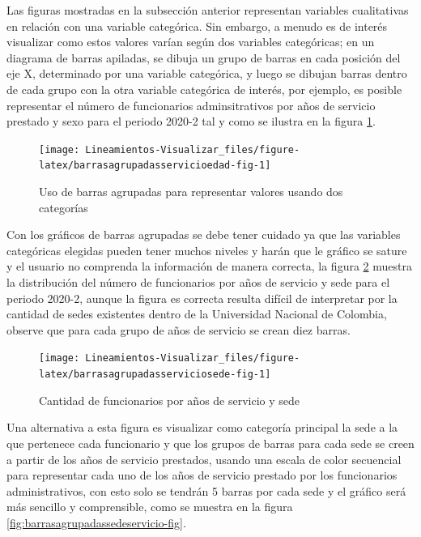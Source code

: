 \documentclass[
]{book}
\begin{document}
Las figuras mostradas en la subsección anterior representan variables cualitativas en relación con una variable categórica. Sin embargo, a menudo es de interés visualizar como estos valores varían según dos variables categóricas; en un diagrama de barras apiladas, se dibuja un grupo de barras en cada posición del eje X, determinado por una variable categórica, y luego se dibujan barras dentro de cada grupo con la otra variable categórica de interés, por ejemplo, es posible representar el número de funcionarios adminsitrativos por años de servicio prestado y sexo para el periodo 2020-2 tal y como se ilustra en la figura \ref{fig:barrasagrupadasservicioedad-fig}.

\begin{figure}

{\centering \texttt{[image: Lineamientos-Visualizar\_files/figure-latex/barrasagrupadasservicioedad-fig-1]} 

}

\caption{Uso de barras agrupadas para representar valores usando dos categorías}\label{fig:barrasagrupadasservicioedad-fig}
\end{figure}

Con los gráficos de barras agrupadas se debe tener cuidado ya que las variables categóricas elegidas pueden tener muchos niveles y harán que le gráfico se sature y el usuario no comprenda la información de manera correcta, la figura \ref{fig:barrasagrupadasserviciosede-fig} muestra la distribución del número de funcionarios por años de servicio y sede para el periodo 2020-2, aunque la figura es correcta resulta difícil de interpretar por la cantidad de sedes existentes dentro de la Universidad Nacional de Colombia, observe que para cada grupo de años de servicio se crean diez barras.

\begin{figure}

{\centering \texttt{[image: Lineamientos-Visualizar\_files/figure-latex/barrasagrupadasserviciosede-fig-1]} 

}

\caption{Cantidad de funcionarios por años de servicio y sede}\label{fig:barrasagrupadasserviciosede-fig}
\end{figure}

Una alternativa a esta figura es visualizar como categoría principal la sede a la que pertenece cada funcionario y que los grupos de barras para cada sede se creen a partir de los años de servicio prestados, usando una escala de color secuencial para representar cada uno de los años de servicio prestado por los funcionarios administrativos, con esto solo se tendrán 5 barras por cada sede y el gráfico será más sencillo y comprensible, como se muestra en la figura \ref{fig:barrasagrupadassedeservicio-fig}.
\end{document}
